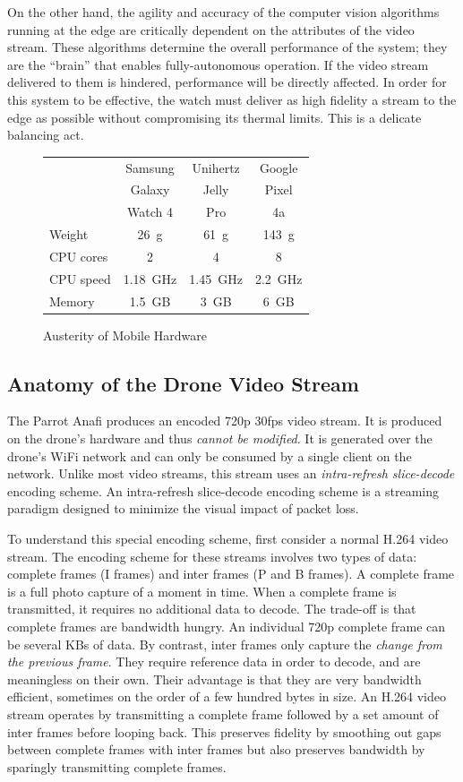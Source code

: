 On the other hand, the agility and accuracy of the computer vision algorithms running at the edge are critically dependent on the attributes of the video stream. These algorithms determine the overall performance of the system; they are the ``brain'' that enables fully-autonomous operation. If the video stream delivered to them is hindered, performance will be directly affected. In order for this system to be effective, the watch must deliver as high fidelity a stream to the edge as possible without compromising its thermal limits. This is a delicate balancing act.

\begin{figure}
\centering
\begin{tabular}{|l|c|c|c|}
\hline
    & Samsung & Unihertz & Google \\
    & Galaxy & Jelly & Pixel\\
    & Watch 4 & Pro & 4a \\
\hline
Weight & 26~g & 61~g & 143~g\\
CPU cores & 2 & 4 & 8 \\
CPU speed & 1.18~GHz&1.45~GHz & 2.2~GHz\\
Memory & 1.5~GB & 3~GB & 6~GB\\
\hline
\end{tabular}
\caption{Austerity of Mobile Hardware}
\label{tab:austerity}
\end{figure}

\subsection{Anatomy of the Drone Video Stream}
\label{sec:anatomy-drone-stream}
The Parrot Anafi produces an encoded 720p 30fps video stream. It is produced on the drone's hardware and thus \textit{cannot be modified}. It is generated over the drone's WiFi network and can only be consumed by a single client on the network. Unlike most video streams, this stream uses an \textit{intra-refresh slice-decode} encoding scheme. An intra-refresh slice-decode encoding scheme is a streaming paradigm designed to minimize the visual impact of packet loss. 

To understand this special encoding scheme, first consider a normal H.264 video stream. The encoding scheme for these streams involves two types of data: complete frames (I frames) and inter frames (P and B frames). A complete frame is a full photo capture of a moment in time. When a complete frame is transmitted, it requires no additional data to decode. The trade-off is that complete frames are bandwidth hungry. An individual 720p complete frame can be several
KBs of data. By contrast, inter frames only capture the \textit{change from the previous frame}. They require reference data in order to decode, and are meaningless on their own. Their advantage is that they are very bandwidth efficient, sometimes on the order of a few hundred bytes in size. An H.264 video stream operates by transmitting a complete frame followed by a set amount of inter frames before looping back. This preserves fidelity by smoothing out gaps between complete frames with inter frames but also preserves bandwidth by sparingly transmitting complete frames.


